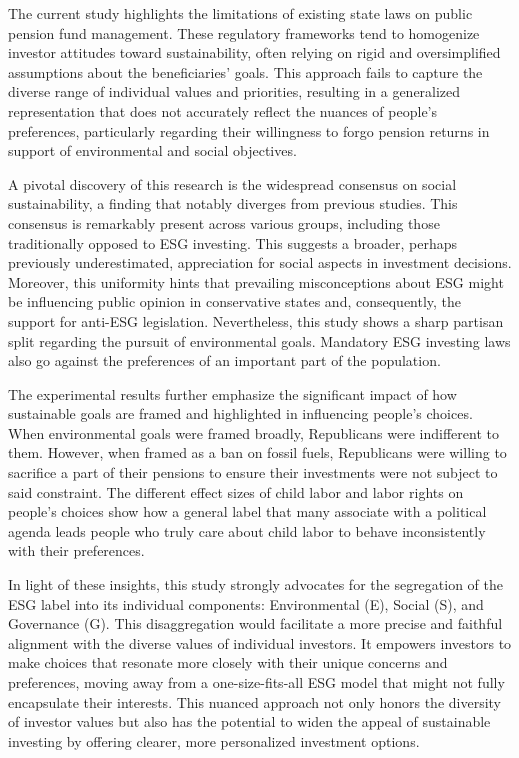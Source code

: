 \documentclass[
  12pt,
]{article}
\begin{document}
The current study highlights the limitations of existing state laws on public pension fund management. These regulatory frameworks tend to homogenize investor attitudes toward sustainability, often relying on rigid and oversimplified assumptions about the beneficiaries' goals. This approach fails to capture the diverse range of individual values and priorities, resulting in a generalized representation that does not accurately reflect the nuances of people's preferences, particularly regarding their willingness to forgo pension returns in support of environmental and social objectives.

A pivotal discovery of this research is the widespread consensus on social sustainability, a finding that notably diverges from previous studies. This consensus is remarkably present across various groups, including those traditionally opposed to ESG investing. This suggests a broader, perhaps previously underestimated, appreciation for social aspects in investment decisions. Moreover, this uniformity hints that prevailing misconceptions about ESG might be influencing public opinion in conservative states and, consequently, the support for anti-ESG legislation. Nevertheless, this study shows a sharp partisan split regarding the pursuit of environmental goals. Mandatory ESG investing laws also go against the preferences of an important part of the population.

The experimental results further emphasize the significant impact of how sustainable goals are framed and highlighted in influencing people's choices. When environmental goals were framed broadly, Republicans were indifferent to them. However, when framed as a ban on fossil fuels, Republicans were willing to sacrifice a part of their pensions to ensure their investments were not subject to said constraint. The different effect sizes of child labor and labor rights on people's choices show how a general label that many associate with a political agenda leads people who truly care about child labor to behave inconsistently with their preferences.

In light of these insights, this study strongly advocates for the segregation of the ESG label into its individual components: Environmental (E), Social (S), and Governance (G). This disaggregation would facilitate a more precise and faithful alignment with the diverse values of individual investors. It empowers investors to make choices that resonate more closely with their unique concerns and preferences, moving away from a one-size-fits-all ESG model that might not fully encapsulate their interests. This nuanced approach not only honors the diversity of investor values but also has the potential to widen the appeal of sustainable investing by offering clearer, more personalized investment options.
\end{document}
